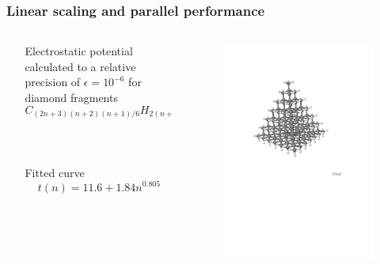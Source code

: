 \begin{frame}
    \frametitle{Linear scaling and parallel performance}
    \begin{columns}
    \begin{column}{.10\textwidth}
    \ \\
    \end{column}
    \begin{column}{.40\textwidth}
    \centering
    Electrostatic potential calculated to a relative precision of $\epsilon=10^{-6}$
    for diamond fragments
    \begin{equation}
	\nonumber
	C_{(2n+3)(n+2)(n+1)/6}H_{2(n+2)(n+1)}
    \end{equation}
    \ \\
    \ \\
    \ \\
    Fitted curve
    \begin{equation}
	\nonumber
	t(n) = 11.6 + 1.84n^{0.805}
    \end{equation}
    \end{column}
    \begin{column}{.50\textwidth}
	\begin{figure}
	    \includegraphics[scale=0.25, clip, viewport = 10 390 500 720]{figures/diamond.pdf}

\end{figure}
\end{column}
\end{columns}
\end{frame}
